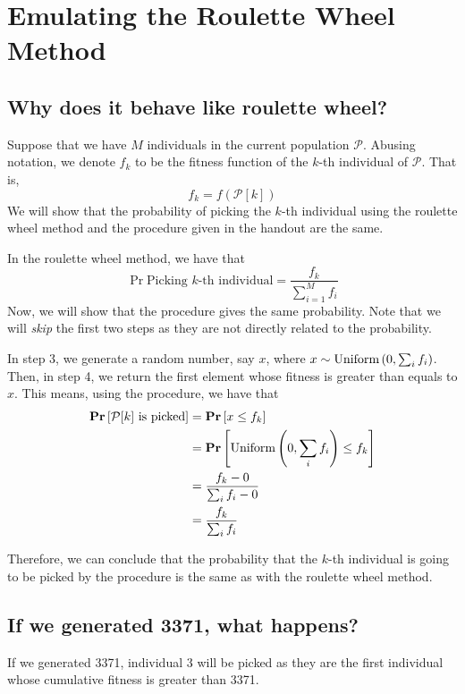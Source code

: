\section{Emulating the Roulette Wheel Method}

\subsection{Why does it behave like roulette wheel?}

Suppose that we have \(M\) individuals in the current population \(\mathcal{P}\). Abusing notation, we denote \(f_k\) to be the fitness function of the \(k\)-th individual of \(\mathcal{P}\). That is, 
\[
    f_k = f(\mathcal{P}[k])
\]
We will show that the probability of picking the \(k\)-th individual using the roulette wheel method and the procedure given in the handout are the same.

In the roulette wheel method, we have that
\[
    \Pr{\text{Picking \(k\)-th individual}} = \frac{f_k}{\sum_{i=1}^M f_i}
\]
Now, we will show that the procedure gives the same probability. Note that we will \textit{skip} the first two steps as they are not directly related to the probability.

In step 3, we generate a random number, say \(x\), where \(x \sim \text{Uniform}\left(0, \sum_i f_i\right)\). Then, in step 4, we return the first element whose fitness is greater than equals to \(x\). This means, using the procedure, we have that
\[
\begin{aligned}
    \mathbf{Pr}\left[\text{\(\mathcal{P}[k]\) is picked}\right]
        &= \mathbf{Pr}\left[x \leq f_k\right] \\
        &= \mathbf{Pr}\left[\text{Uniform}\left(0, \sum_i f_i\right) \leq f_k\right] \\
        &= \frac{f_k - 0}{\sum_i f_i - 0} \\
        &= \frac{f_k}{\sum_i f_i}
\end{aligned}
\]

Therefore, we can conclude that the probability that the \(k\)-th individual is going to be picked by the procedure is the same as with the roulette wheel method.

\subsection{If we generated 3371, what happens?}

If we generated 3371, individual 3 will be picked as they are the first individual whose cumulative fitness is greater than 3371.

